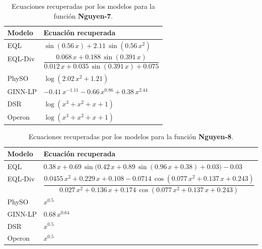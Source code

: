 \begin{table}[H]
    \centering
    \caption{Ecuaciones recuperadas por los modelos para la función \textbf{Nguyen-7}.}
    \begin{tabular}{lp{11cm}}
        \hline
        \textbf{Modelo} & \textbf{Ecuación recuperada} \\ \hline
        EQL &
        $\sin(0.56\,x) + 2.11\,\sin(0.56\,x^{2})$ \\ \hline
        EQL-Div &
        $\dfrac{0.068\,x + 0.188\,\sin(0.391\,x)}
              {0.012\,x + 0.035\,\sin(0.391\,x) + 0.075}$ \\ \hline
        PhySO &
        $\log(2.02\,x^{2} + 1.21)$ \\ \hline
        GINN-LP &
        $-0.41\,x^{-1.11} - 0.66\,x^{0.86} + 0.38\,x^{2.44}$ \\ \hline
        DSR &
        $\log(x^{3} + x^{2} + x + 1)$ \\ \hline
        Operon &
        $\log(x^{3} + x^{2} + x + 1)$ \\ \hline
    \end{tabular}
\end{table}


\begin{table}[H]
    \centering
    \caption{Ecuaciones recuperadas por los modelos para la función \textbf{Nguyen-8}.}
    \begin{tabular}{lp{11cm}}
        \hline
        \textbf{Modelo} & \textbf{Ecuación recuperada} \\ \hline
        EQL &
        $0.38\,x + 0.69\,\sin\!\bigl(0.42\,x + 0.89\,\sin(0.96\,x + 0.38) + 0.03\bigr) - 0.03$ \\ \hline
        EQL-Div &
        $\dfrac{0.0455\,x^{2} + 0.229\,x + 0.108 - 0.0714\,\cos(0.077\,x^{2} + 0.137\,x + 0.243)}
               {0.027\,x^{2} + 0.136\,x + 0.174\,\cos(0.077\,x^{2} + 0.137\,x + 0.243)}$ \\ \hline
        PhySO &
        $x^{0.5}$ \\ \hline
        GINN-LP &
        $0.68\,x^{0.64}$ \\ \hline
        DSR &
        $x^{0.5}$ \\ \hline
        Operon &
        $x^{0.5}$ \\ \hline
    \end{tabular}
\end{table}


